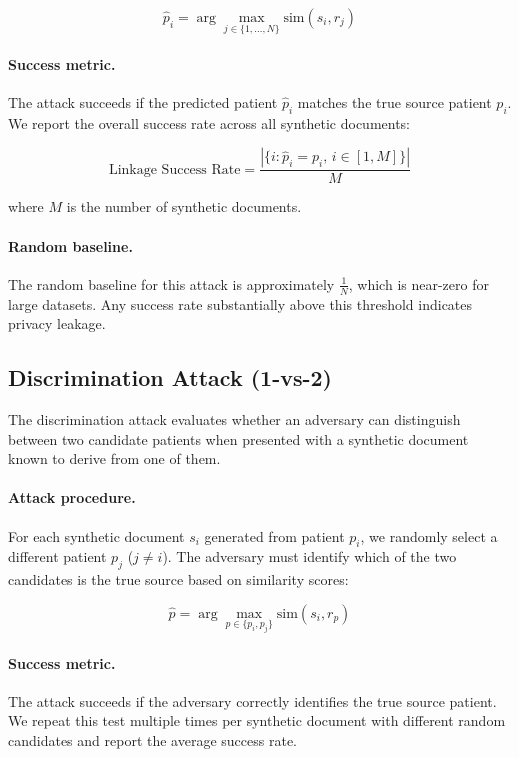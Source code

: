 \begin{equation}
    \hat{p}_i = \arg\max_{j \in \{1,...,N\}} \text{sim}(s_i, r_j)
\end{equation}

\paragraph{Success metric.} The attack succeeds if the predicted patient $\hat{p}_i$ matches the true source patient $p_i$. We report the overall success rate across all synthetic documents:

\begin{equation}
\text{Linkage Success Rate} = \frac{|\{i : \hat{p}_i = p_i, \, i \in [1,M]\}|}{M}
\end{equation}

where $M$ is the number of synthetic documents.

\paragraph{Random baseline.} The random baseline for this attack is approximately $\frac{1}{N}$, which is near-zero for large datasets. Any success rate substantially above this threshold indicates privacy leakage.

\subsection{Discrimination Attack (1-vs-2)}
\label{subsec:discrimination_attack}

The discrimination attack evaluates whether an adversary can distinguish between two candidate patients when presented with a synthetic document known to derive from one of them.

\paragraph{Attack procedure.} For each synthetic document $s_i$ generated from patient $p_i$, we randomly select a different patient $p_j$ ($j \neq i$). The adversary must identify which of the two candidates is the true source based on similarity scores:

\begin{equation}
    \hat{p} = \arg\max_{p \in \{p_i, p_j\}} \text{sim}(s_i, r_p)
\end{equation}

\paragraph{Success metric.} The attack succeeds if the adversary correctly identifies the true source patient. We repeat this test multiple times per synthetic document with different random candidates and report the average success rate.

